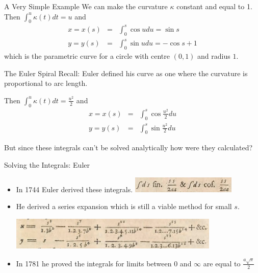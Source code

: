 \documentclass{beamer}
\begin{document}
\begin{frame}{A Very Simple Example}
	We can make the curvature $\kappa$ constant and equal to 1. Then 
	$ \int_0^u \kappa(t) dt = u $ and
	\begin{eqnarray*}
		x = x(s) &=& \int_{0}^{s} \cos u du = \sin s\\
		y = y(s) &=& \int_{0}^{s} \sin u du = - \cos s + 1
	\end{eqnarray*}
	which is the parametric curve for a circle with centre $(0, 1)$ and radius $1$.
	
\end{frame}


\begin{frame}{The Euler Spiral}
	Recall: Euler defined his curve as one where the curvature is proportional to arc length.
	
	\begin{center}
	\end{center}
	Then 
	$ \int_0^u \kappa(t) dt = \frac{u^2}{2} $ and
	\begin{eqnarray*}
		x = x(s) &=& \int_{0}^{s} \cos \frac{u^2}{2} du\\
		y = y(s) &=& \int_{0}^{s} \sin \frac{u^2}{2} du
	\end{eqnarray*}

	But since these integrals can't be solved analytically how were they calculated?
\end{frame}

\begin{frame}{Solving the Integrals: Euler}
	\begin{itemize}
		\item In 1744 Euler derived these integrals.
		\includegraphics[width=50mm, scale=0.5]{euler_scripture_1.png}	
		\item He derived a series expansion which is still a viable method for small $s$.
		
		\includegraphics[width=100mm, scale=0.7]{euler_scripture.png}
		
		\item In 1781 he proved the integrals for limits between 0 and $\infty$ are equal to  $\frac{a \sqrt{\pi}}{2}$ 
	\end{itemize}
\end{frame}
\end{document}
